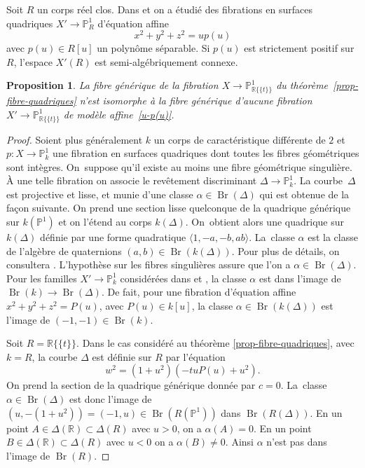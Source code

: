 \documentclass[11pt]{article}
\newtheorem{prop}[thm]{Proposition}
\theoremstyle{definition}
\newcommand{\R}{\mathbb R}
\renewcommand{\P}{\mathbb P}
\newcommand{\Br}{\operatorname{Br}}
\newcommand{\on}[1]{\operatorname{#1}}
\newcommand{\puiseux}{\mathbb{R}\{\!\{t\}\!\}}
\begin{document}
Soit $R$ un corps réel clos. Dans \cite{colliot2024certaines} et \cite{benoist2026rationality} on a étudié des fibrations en surfaces quadriques $X'\to \P^1_R$ d'équation affine
\begin{equation}\label{u-p(u)} x^2+y^2+z^2= u p(u)\end{equation}
avec $p(u)\in R[u]$ un polynôme séparable. Si $p(u)$ est strictement positif sur $R$, l'espace $X'(R)$ est semi-algébriquement connexe.

\begin{prop}
La fibre générique de la fibration $X \!\to\! \P^1_{\puiseux}$ du théorème~\ref{prop-fibre-quadriques} n'est isomorphe à la fibre générique d'aucune fibration $X'\to \P^1_{\puiseux}$ de modèle affine~\eqref{u-p(u)}.
\end{prop}
\begin{proof}
Soient plus généralement $k$ un corps de caractéristique différente de $2$ et $p\colon X \to \P^1_{k}$ une fibration en surfaces quadriques dont toutes les fibres
géométriques sont intègres. On~suppose qu'il existe au moins une fibre
géométrique singulière.
À une telle fibration on associe le revêtement discriminant $\Delta \to \P^1_{k}$.
La courbe~$\Delta$ est projective et lisse, et munie d'une classe
$\alpha \in \Br(\Delta)$ qui est obtenue de la façon suivante.
On prend une section lisse quelconque de la quadrique générique sur $k(\P^1)$
et on l'étend au corps $k(\Delta)$. On~obtient alors une quadrique sur
$k(\Delta)$ définie par une forme quadratique $\langle 1,-a,-b,ab\rangle$. La~classe $\alpha$ est la classe de l'algèbre de quaternions $(a,b)\in \on{Br}(k(\Delta))$. Pour plus de détails, on consultera
\cite[Th.\,2.5]{colliot1993groupe}.
L'hypothèse sur les fibres singulières
assure que l'on a $\alpha \in \Br(\Delta)$.
Pour les familles $X' \to \P^1_{k}$ considérées
dans \cite{colliot2024certaines} et \cite{benoist2026rationality}, la classe $\alpha$ est dans l'image
de $\Br(k) \to \Br(\Delta)$. De fait, pour une fibration d'équation affine
$x^2+y^2+z^2=P(u)$, avec $P(u)\in k[u]$, la classe $\alpha \in \Br (k(\Delta))$ est l'image de $(-1,-1) \in \Br(k)$.

Soit $R=\puiseux$. Dans le cas considéré au théorème
\ref{prop-fibre-quadriques}, avec $k=R$,
la courbe $\Delta$ est définie sur $R$ par l'équation
\[
 w^2= (1+u^2)(-tuP(u)+u^2).
\]
On prend la section de la quadrique générique donnée par $c=0$. La~classe
$\alpha \in \Br(\Delta)$ est donc l'image de $(u,-(1+u^2))=(-1,u) \in \Br(R(\P^1))$ dans
$\Br(R(\Delta))$. En un point $A \in \Delta(\R) \subset \Delta(R)$ avec $u>0$,
on a $\alpha(A)=0$. En un point $B \in \Delta(\R) \subset \Delta(R)$
avec $u<0$ on a $\alpha(B)\neq 0$. Ainsi $\alpha$ n'est pas dans
l'image de $\Br(R)$.
\end{proof}
\end{document}
